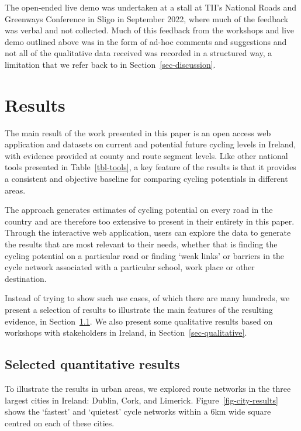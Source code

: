 \documentclass[
  super,
  preprint,
  3p]{elsarticle}
\begin{document}
{The open-ended live demo was undertaken at a stall at TII's National
Roads and Greenways Conference in Sligo in September 2022, where much of
the feedback was verbal and not collected. Much of this feedback from
the workshops and live demo outlined above was in the form of ad-hoc
comments and suggestions and not all of the qualitative data received
was recorded in a structured way, a limitation that we refer back to in
Section~\ref{sec-discussion}.}

\section{Results}\label{sec-results}

The main result of the work presented in this paper is an open access
web application and datasets on current and potential future cycling
levels in Ireland, with evidence provided at county and route segment
levels. Like other national tools presented in Table~\ref{tbl-tools}, a
key feature of the results is that it provides a consistent and
objective baseline for comparing cycling potentials in different areas.

The approach generates estimates of cycling potential on every road in
the country and are therefore too extensive to present in their entirety
in this paper. Through the interactive web application, users can
explore the data to generate the results that are most relevant to their
needs, whether that is finding the cycling potential on a particular
road or finding `weak links' or barriers in the cycle network associated
with a particular school, work place or other destination.

Instead of trying to show such use cases, of which there are many
hundreds, we present a selection of results to illustrate the main
features of the resulting evidence, in Section~\ref{sec-quantiative}. We
also present some qualitative results based on workshops with
stakeholders in Ireland, in Section~\ref{sec-qualitative}.

\subsection{Selected quantitative results}\label{sec-quantiative}

To illustrate the results in urban areas, we explored route networks in
the three largest cities in Ireland: Dublin, Cork, and Limerick.
Figure~\ref{fig-city-results} shows the `fastest' and `quietest' cycle
networks within a 6km wide square centred on each of these cities.
\end{document}
